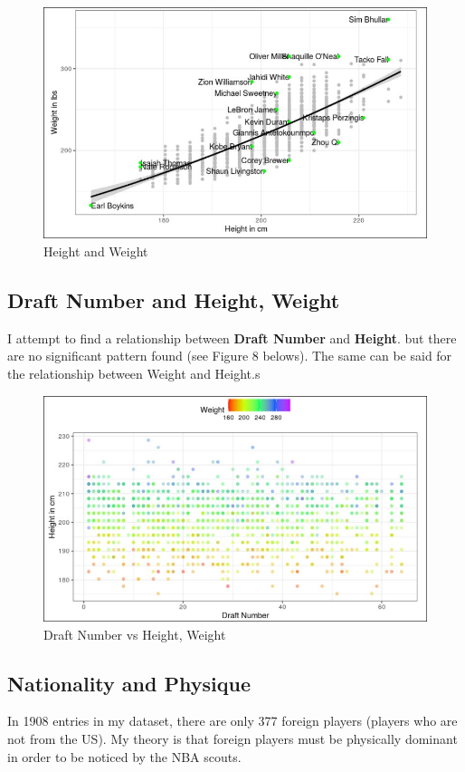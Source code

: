 \documentclass[a4paper,12pt,twoside]{article}
\numberwithin{equation}{section}
\begin{document}
\begin{figure}[h]
\caption{Height and Weight}
\includegraphics[scale=0.35]{hvw.jpg}
\centering
\end{figure}



\subsection{Draft Number and Height, Weight}

I attempt to find a relationship between \textbf{Draft Number} and \textbf{Height}. but there are no significant pattern found (see Figure 8 belows). The same can be said for the relationship between Weight and Height.s
\begin{figure}[h]
\caption{Draft Number vs Height, Weight}
\includegraphics[scale=0.3]{hvdrf.jpg}
\centering
\end{figure}

\subsection{Nationality and Physique}
In 1908 entries in my dataset, there are only 377 foreign players (players who are not from the US). My theory is that foreign players must be physically dominant in order to be noticed by the NBA scouts. 
\end{document}
